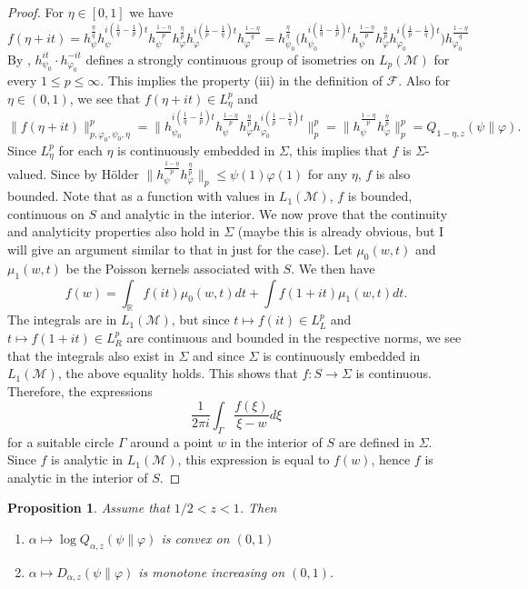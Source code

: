 \documentclass[12pt]{article}
\newtheorem{prop}{Proposition}
\theoremstyle{definition}
\theoremstyle{remark}
\def\Me{\mathcal M}
\def\Fe{\mathcal F}
\begin{document}
\begin{proof} For $\eta\in [0,1]$ we have
\[
f(\eta+it)=h_\psi^{\frac{\eta}q}h_\psi^{i(\frac 1q-\frac
1p)t}h_\psi^{\frac{1-\eta}p}h_\varphi^{\frac{\eta}p}h_\varphi^{i(\frac 1p-\frac
1q)t}h_\varphi^{\frac{1-\eta}q}=h_{\psi_0}^{\frac{\eta}q}\bigl(h_{\psi_0}^{i(\frac 1q-\frac
1p)t}h_\psi^{\frac{1-\eta}p}h_\varphi^{\frac{\eta}p}h_{\varphi_0}^{i(\frac 1p-\frac
1q)t}\bigr)h_{\varphi_0}^{\frac{1-\eta}q}
\]
By \cite[Lemmas 10.1 and 10.2]{kosaki1984applications}, $h_{\psi_0}^{it} \cdot
h_{\varphi_0}^{-it}$ defines a strongly continuous group of isometries on $L_p(\Me)$ for
every $1\le p\le \infty$. This implies the property (iii) in the definition of $\Fe$.
Also for $\eta\in (0,1)$, we see that $f(\eta+it)\in L^p_\eta$ and
\[
\|f(\eta+it)\|_{p,\varphi_0,\psi_0,\eta}^p=\|h_{\psi_0}^{i(\frac 1q-\frac
1p)t}h_\psi^{\frac{1-\eta}p}h_\varphi^{\frac{\eta}p}h_{\varphi_0}^{i(\frac 1p-\frac
1q)t}\|_p^p=\|h_\psi^{\frac{1-\eta}p}h_\varphi^{\frac{\eta}p}\|_p^p=Q_{1-\eta,z}(\psi\|\varphi).
\]
Since $L^p_\eta$ for each $\eta$ is continuously
embedded in $\Sigma$, this implies that $f$ is $\Sigma$-valued. Since by H\"older
$\|h_\psi^{\frac{1-\eta}p}h_\varphi^{\frac{\eta}p}\|_p\le \psi(1)\varphi(1)$ for any $\eta$, $f$ is also
bounded. Note that as a function with values in $L_1(\Me)$, $f$ is bounded, continuous on
$S$ and analytic in the interior. We now prove that the continuity and analyticity  properties also hold in $\Sigma$
(maybe this is already obvious, but I will give an argument similar to that in \cite[Sec.
9.1,29.1]{calderon1964intermediate} just for the case). Let $\mu_0(w,t)$ and $\mu_1(w,t)$ be the Poisson
kernels associated with $S$. We then have
\[
f(w)=\int_{\mathbb R} f(it)\mu_0(w,t)dt+\int f(1+it)\mu_1(w,t)dt.
\]
The integrals are in $L_1(\Me)$, but since $t\mapsto f(it)\in L^p_L$ and $t\mapsto
f(1+it)\in L^p_R$ are continuous and bounded in the respective norms, we see that the integrals
also exist in $\Sigma$ and since $\Sigma$ is continuously embedded in $L_1(\Me)$, the
above equality holds.  This shows that $f:S\to \Sigma$ is continuous. Therefore, the
expressions 
\[
\frac1{2\pi i}\int_\Gamma \frac{f(\xi)}{\xi-w}d\xi
\]
for a suitable circle $\Gamma$ around a point $w$ in the interior of $S$ are defined in
$\Sigma$. Since $f$ is analytic in $L_1(\Me)$, this
expression is equal to $f(w)$, hence $f$ is analytic in the interior of $S$.

\end{proof}




\begin{prop}\label{prop:incr2}
Assume that $1/2<z< 1$.  Then 
\begin{enumerate}
\item $\alpha\mapsto \log
Q_{\alpha,z}(\psi\|\varphi)$ is convex on $(0,1)$
\item $\alpha\mapsto D_{\alpha,z}(\psi\|\varphi)$ is monotone increasing on $(0,1)$.
\end{enumerate}



\end{prop}
\end{document}

